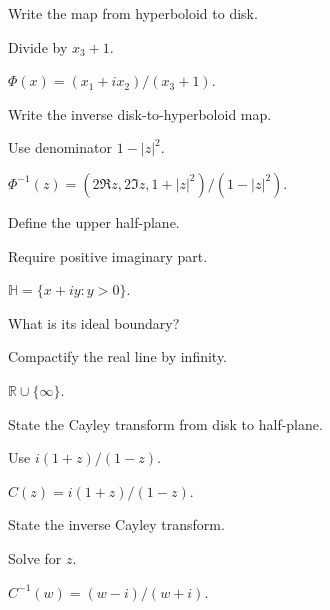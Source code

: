 \begin{exercise}\label{exr:vii31-07}
Write the map from hyperboloid to disk.
\end{exercise}
\begin{hint}
Divide by \(x_3+1\).
\end{hint}
\begin{solution}
\(\Phi(x)=(x_1+ix_2)/(x_3+1)\).
\end{solution}

\begin{exercise}\label{exr:vii31-08}
Write the inverse disk-to-hyperboloid map.
\end{exercise}
\begin{hint}
Use denominator \(1-|z|^2\).
\end{hint}
\begin{solution}
\(\Phi^{-1}(z)=(2\Re z,2\Im z,1+|z|^2)/(1-|z|^2)\).
\end{solution}

\begin{exercise}\label{exr:vii31-09}
Define the upper half-plane.
\end{exercise}
\begin{hint}
Require positive imaginary part.
\end{hint}
\begin{solution}
\(\mathbb H=\{x+iy:y>0\}\).
\end{solution}

\begin{exercise}\label{exr:vii31-10}
What is its ideal boundary?
\end{exercise}
\begin{hint}
Compactify the real line by infinity.
\end{hint}
\begin{solution}
\(\mathbb R\cup\{\infty\}\).
\end{solution}

\begin{exercise}\label{exr:vii31-11}
State the Cayley transform from disk to half-plane.
\end{exercise}
\begin{hint}
Use \(i(1+z)/(1-z)\).
\end{hint}
\begin{solution}
\(C(z)=i(1+z)/(1-z)\).
\end{solution}

\begin{exercise}\label{exr:vii31-12}
State the inverse Cayley transform.
\end{exercise}
\begin{hint}
Solve for \(z\).
\end{hint}
\begin{solution}
\(C^{-1}(w)=(w-i)/(w+i)\).
\end{solution}

